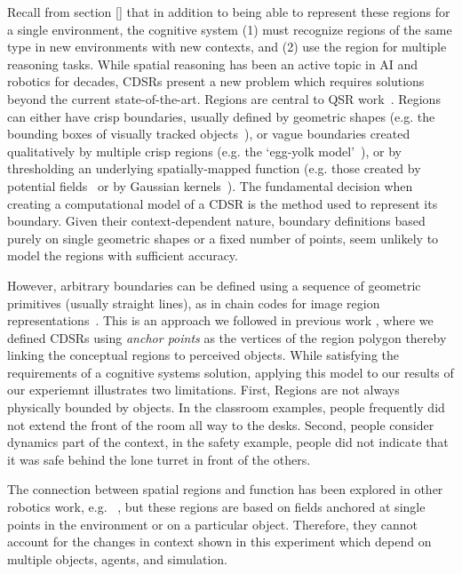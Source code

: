 \documentclass[11pt,letterpaper]{article}
\begin{document}
Recall from section \ref{} that in addition to being able to represent these regions for a single environment, the cognitive system (1) must recognize regions of the same type in new environments with new contexts, and (2) use the region for multiple reasoning tasks.  While spatial reasoning has been an active topic in AI and robotics for decades, CDSRs present a new problem which requires solutions beyond the current state-of-the-art. Regions are central to QSR work~\cite{Cohn:2001}. Regions can either have crisp boundaries, usually defined by geometric shapes (e.g. the bounding boxes of visually tracked objects~\cite{SridharCohn:10}), or vague boundaries created qualitatively by multiple crisp regions (e.g. the `egg-yolk model'~\cite{Cohn96b}), or by thresholding an underlying spatially-mapped function (e.g. those created by potential fields~\cite{brenneretal07ijcai} or by Gaussian kernels~\cite{burbridge-dearden12}). The fundamental decision when creating a computational model of a CDSR is the method used to represent its boundary. Given their context-dependent nature, boundary definitions based purely on single geometric shapes or a fixed number of points, seem unlikely to model the regions with sufficient accuracy.

However, arbitrary boundaries can be defined using a sequence of geometric primitives (usually straight lines), as in chain codes for image region representations~\cite{Freeman:1961}. This is an approach we followed in previous work \cite{Hawes:2012}, where we defined CDSRs using \textit{anchor points} \cite{DBLP:journals/jetai/KlenkFTK11} as the vertices of the region polygon thereby linking the conceptual regions to perceived objects.   While satisfying the requirements of a cognitive systems solution, applying this model to our results of our experiemnt illustrates two limitations.  First, Regions are not always physically bounded by objects.  In the classroom examples, people frequently did not extend the front of the room all way to the desks.  Second, people consider dynamics part of the context, in the safety example, people did not indicate that it was safe behind the lone turret in front of the others.

The connection between spatial regions and function has been explored in other robotics work, e.g. ~\cite{Karg:2012,Fasola:2013}, but these regions are based on fields anchored at single points in the environment or on a particular object. Therefore, they cannot account for the changes in context shown in this experiment which depend on multiple objects, agents, and simulation.
\end{document}
